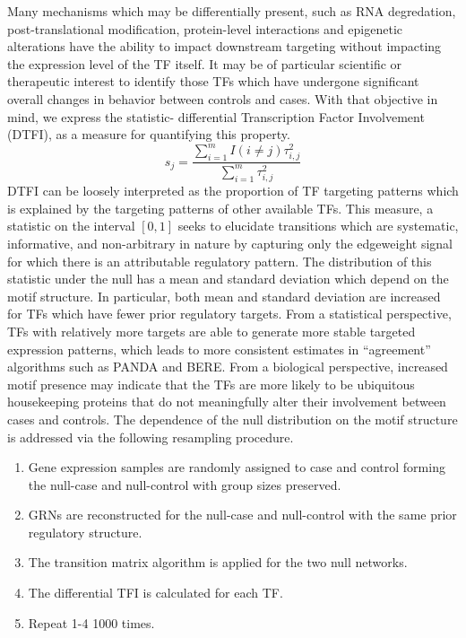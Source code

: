 \documentclass[english]{article}
\begin{document}
Many mechanisms which may be differentially present, such as RNA degredation,
post-translational modification, protein-level interactions and epigenetic
alterations have the ability to impact downstream targeting without
impacting the expression level of the TF itself. It may be of particular
scientific or therapeutic interest to identify those TFs which have
undergone significant overall changes in behavior between controls
and cases. With that objective in mind, we express the statistic-
differential Transcription Factor Involvement (DTFI), as a measure
for quantifying this property. 
\[
s_{j}=\frac{\sum_{i=1}^{m}I\left(i\ne j\right)\tau_{i,j}^{2}}{\sum_{i=1}^{m}\tau_{i,j}^{2}}
\]
 DTFI can be loosely interpreted as the proportion of TF targeting
patterns which is explained by the targeting patterns of other available
TFs. This measure, a statistic on the interval $[0,1]$ seeks to elucidate
transitions which are systematic, informative, and non-arbitrary in
nature by capturing only the edgeweight signal for which there is
an attributable regulatory pattern. The distribution of this statistic
under the null has a mean and standard deviation which depend on the
motif structure. In particular, both mean and standard deviation are
increased for TFs which have fewer prior regulatory targets. From
a statistical perspective, TFs with relatively more targets are able
to generate more stable targeted expression patterns, which leads
to more consistent estimates in “agreement” algorithms such as PANDA
and BERE. From a biological perspective, increased motif presence
may indicate that the TFs are more likely to be ubiquitous housekeeping
proteins that do not meaningfully alter their involvement between
cases and controls. The dependence of the null distribution on the
motif structure is addressed via the following resampling procedure. 
\begin{enumerate}
\item Gene expression samples are randomly assigned to case and control
forming the null-case and null-control with group sizes preserved. 
\item GRNs are reconstructed for the null-case and null-control with the
same prior regulatory structure. 
\item The transition matrix algorithm is applied for the two null networks. 
\item The differential TFI is calculated for each TF. 
\item Repeat 1-4 1000 times. 
\end{enumerate}
\end{document}
